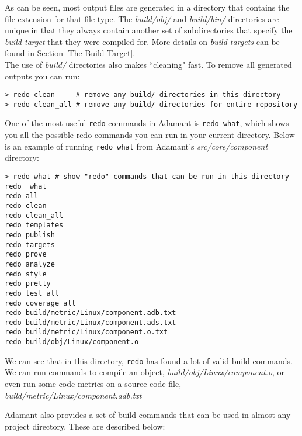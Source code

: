 As can be seen, most output files are generated in a directory that contains the file extension for that file type. The \textit{build/obj/} and \textit{build/bin/} directories are unique in that they always contain another set of subdirectories that specify the \textit{build target} that they were compiled for. More details on \textit{build targets} can be found in Section \ref{The Build Target}. \\

The use of \textit{build/} directories also makes ``cleaning" fast. To remove all generated outputs you can run:

\vspace{5mm} %
\begin{verbatim}
> redo clean     # remove any build/ directories in this directory
> redo clean_all # remove any build/ directories for entire repository
\end{verbatim}
\vspace{5mm} %

One of the most useful \texttt{redo} commands in Adamant is \texttt{redo what}, which shows you all the possible redo commands you can run in your current directory. Below is an example of running \texttt{redo what} from Adamant's \textit{src/core/component} directory:

\vspace{5mm} %
\begin{verbatim}
> redo what # show "redo" commands that can be run in this directory
redo  what
redo all
redo clean
redo clean_all
redo templates
redo publish
redo targets
redo prove
redo analyze
redo style
redo pretty
redo test_all
redo coverage_all
redo build/metric/Linux/component.adb.txt
redo build/metric/Linux/component.ads.txt
redo build/metric/Linux/component.o.txt
redo build/obj/Linux/component.o
\end{verbatim}
\vspace{5mm} %

We can see that in this directory, \texttt{redo} has found a lot of valid build commands. We can run commands to compile an object, \textit{build/obj/Linux/component.o}, or even run some code metrics on a source code file, \textit{build/metric/Linux/component.adb.txt}

Adamant also provides a set of build commands that can be used in almost any project directory. These are described below:

